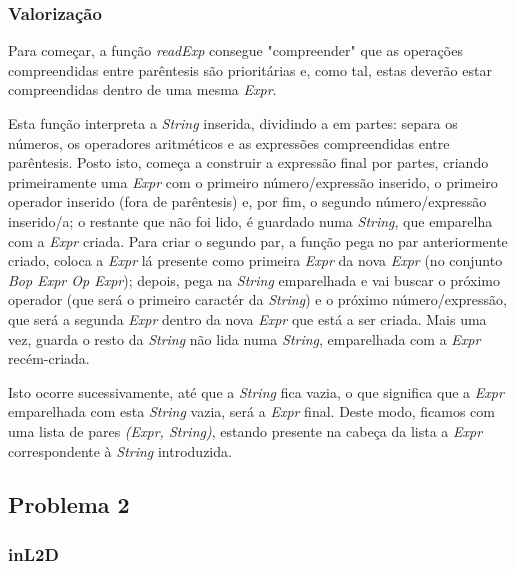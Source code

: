 \documentclass[a4paper]{article}
\begin{document}
\subsubsection*{Valorização}

\par\noindent\hspace{0.5cm}Para começar, a função \textit{readExp} consegue "compreender" que as operações compreendidas entre parêntesis são prioritárias e, como tal, estas deverão estar compreendidas dentro de uma mesma \textit{Expr}.
\par Esta função interpreta a \textit{String} inserida, dividindo a em partes: separa os números, os operadores aritméticos e as expressões compreendidas entre parêntesis. Posto isto, começa a construir a expressão final por partes, criando primeiramente uma \textit{Expr} com o primeiro número/expressão inserido, o primeiro operador inserido (fora de parêntesis) e, por fim, o segundo número/expressão inserido/a; o restante que não foi lido, é guardado numa \textit{String}, que emparelha com a \textit{Expr} criada. Para criar o segundo par, a função pega no par anteriormente criado, coloca a \textit{Expr} lá presente como primeira \textit{Expr} da nova \textit{Expr} (no conjunto \textit{Bop Expr Op Expr}); depois, pega na \textit{String} emparelhada e vai buscar o próximo operador (que será o primeiro caractér da \textit{String}) e o próximo número/expressão, que será a segunda \textit{Expr} dentro da nova \textit{Expr} que está a ser criada. Mais uma vez, guarda o resto da \textit{String} não lida numa \textit{String}, emparelhada com a \textit{Expr} recém-criada.
\par Isto ocorre sucessivamente, até que a \textit{String} fica vazia, o que significa que a \textit{Expr} emparelhada com esta \textit{String} vazia, será a \textit{Expr} final. Deste modo, ficamos com uma lista de pares \textit{(Expr, String)}, estando presente na cabeça da lista a \textit{Expr} correspondente à \textit{String} introduzida.

\subsection*{Problema 2}

\subsubsection*{inL2D}
\end{document}
